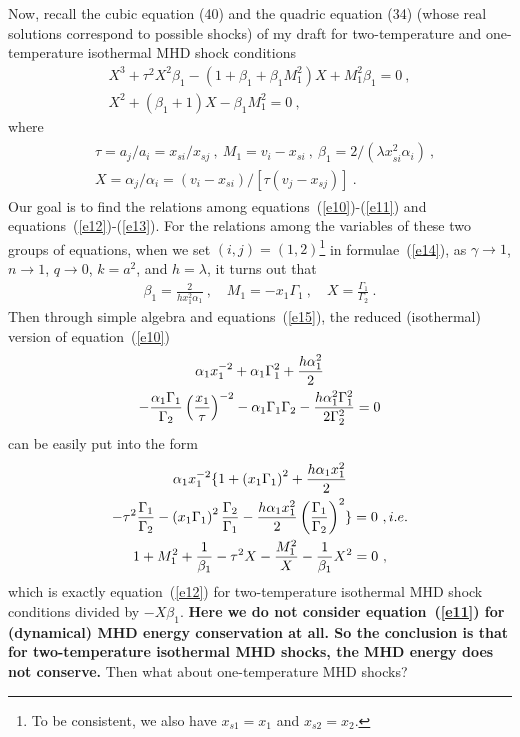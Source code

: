 \documentclass[fleqn,usenatbib]{mnras}
\begin{document}
Now, recall the cubic equation (40) and the quadric equation (34) (whose real solutions correspond to possible shocks) of my draft for two-temperature and one-temperature isothermal MHD shock conditions
\begin{gather}
X^{3}+\tau^{2}X^{2}\beta_{1}-\left(1+\beta_{1}+\beta_{1}M_{1}^{2}\right)X+M_{1}^{2}\beta_{1}=0\ ,\label{e12}\\
X^{2}+\left(\beta_{1}+1\right)X-\beta_{1}M_{1}^{2}=0\ ,\label{e13}
\end{gather}
where 
\begin{gather}
\begin{split}
&\tau=a_{j}/a_{i}=x_{si}/x_{sj}\ ,
\ M_{1}=v_{i}-x_{si}\ ,
\ \beta_{1}=2/(\lambda x^{2}_{si}\alpha_{i})\ ,\\
&X=\alpha_{j}/\alpha_{i}=(v_{i}-x_{si})/[\tau (v_{j}-x_{sj})]\ .
\end{split}\label{e14}
\end{gather}
Our goal is to find the relations among equations~(\ref{e10})-(\ref{e11}) and equations~(\ref{e12})-(\ref{e13}). For the relations among the variables of these two groups of equations, when we set $(i,j)=(1,2)$\footnote{To be consistent, we also have $x_{s1}=x_{1}$ and $x_{s2}=x_{2}$.} in formulae~(\ref{e14}), as $\gamma\rightarrow 1$, $n\rightarrow 1$, $q\rightarrow 0$, $k=a^{2}$, and $h=\lambda$, it turns out that
\begin{gather}
\beta_{1}=\frac{2}{hx_{1}^{2}\alpha_{1}}\ ,\quad M_{1}=-x_{1}\Gamma_{1}\ ,\quad X=\frac{\Gamma_{1}}{\Gamma_{2}}\ .\label{e15}
\end{gather}
Then through simple algebra and equations~(\ref{e15}), the reduced (isothermal) version of equation~(\ref{e10})
\begin{gather}
\alpha_{1}x_{1}^{-2}+\alpha_{1}\Gamma_{1}^{2}+\frac{h\alpha_{1}^{2}}{2}\notag\\
-\frac{\alpha_{1}\Gamma_{1}}{\Gamma_{2}}\left(\frac{x_{1}}{\tau}\right)^{-2}-\alpha_{1}\Gamma_{1}\Gamma_{2}-\frac{h\alpha_{1}^{2}\Gamma_{1}^{2}}{2\Gamma_{2}^{2}}=0 \label{e16}
\end{gather}
can be easily put into the form
\begin{gather}
\alpha_{1}x_{1}^{-2}\lbrace 1+\left(x_{1}\Gamma_{1}\right)^{2}+\frac{h\alpha_{1}x_{1}^{2}}{2}\notag\\
-\tau^{2}\frac{\Gamma_{1}}{\Gamma_{2}}-\left(x_{1}\Gamma_{1}\right)^{2}\frac{\Gamma_{2}}{\Gamma_{1}}-\frac{h\alpha_{1}x_{1}^{2}}{2}\left(\frac{\Gamma_{1}}{\Gamma_{2}}\right)^{2}\rbrace=0\ ,i.e.\notag\\
1+M_{1}^{2}+\frac{1}{\beta_{1}}-\tau^{2}X-\frac{M_{1}^{2}}{X}-\frac{1}{\beta_{1}}X^{2}=0\ ,\label{e17}
\end{gather}
which is exactly equation~(\ref{e12}) for two-temperature isothermal MHD shock conditions divided by $-X\beta_{1}$. \textbf{Here we do not consider equation~(\ref{e11}) for (dynamical) MHD energy conservation at all. So the conclusion is that for two-temperature isothermal MHD shocks, the MHD energy does not conserve.} Then what about one-temperature MHD shocks?
\end{document}
